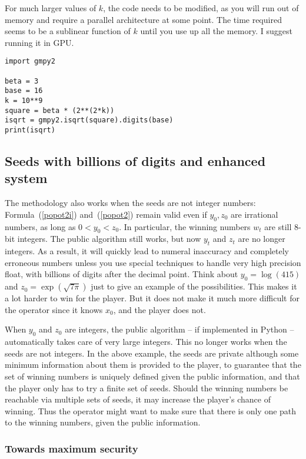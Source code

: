 \documentclass[oneside,10pt]{book}
\begin{document}
For much larger values of $k$, the code needs to be modified, as you will run out of memory and require a parallel architecture at some point. The time required seems to be a sublinear function of $k$ until you use  up all the memory. I suggest running it in GPU. \vspace{1ex}

\begin{lstlisting}
import gmpy2

beta = 3
base = 16
k = 10**9
square = beta * (2**(2*k))
isqrt = gmpy2.isqrt(square).digits(base)
print(isqrt)
\end{lstlisting}


\subsection{Seeds with billions of digits and enhanced system}\label{sredsa}

The methodology also works when the seeds are not integer numbers: Formula~(\ref{popot2i}) and~(\ref{popot2}) remain valid even
 if $y_0, z_0$ are irrational numbers, as long as $0< y_0< z_0$. In particular, the winning numbers $w_t$ are still 8-bit integers. The public algorithm still works, but now $y_t$ and $z_t$ are no longer integers. As a result, it will quickly lead to numeral inaccuracy and completely erroneous numbers unless you use special techniques to handle very high precision float, with billions of digits after the decimal point. Think about $y_0 = \log(415)$ and
 $z_0 = \exp(\sqrt{7\pi})$ just to give an example of the possibilities. This makes it a lot harder to win for the player. But
it does not  make it much more difficult for the operator since it knows $x_0$, and the player does not.

When $y_0$ and $z_0$ are integers, the public algorithm -- if implemented in Python -- automatically takes care of very large integers. This no longer works when the seeds are not integers. In the above example, the seeds are private although some minimum information about them is provided to the player, to guarantee that the set of winning numbers is uniquely defined given the public information, and that the player only has to try a finite set of seeds.  Should the winning numbers be reachable via multiple sets of seeds, it may increase the player's chance of winning. Thus the operator might want to make sure that there is only one path to the winning numbers, given the public information.

\subsubsection{Towards maximum security}\label{tms20}
\end{document}
